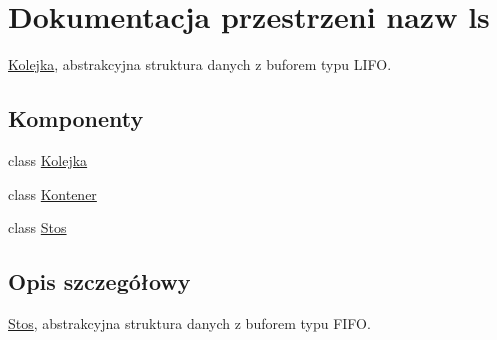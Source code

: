 \hypertarget{namespacels}{\section{Dokumentacja przestrzeni nazw ls}
\label{namespacels}
}


\hyperlink{classls_1_1_kolejka}{Kolejka}, abstrakcyjna struktura danych z buforem typu L\-I\-F\-O.  


\subsection*{Komponenty}
\begin{DoxyCompactItemize}
\item 
class \hyperlink{classls_1_1_kolejka}{Kolejka}
\item 
class \hyperlink{classls_1_1_kontener}{Kontener}
\item 
class \hyperlink{classls_1_1_stos}{Stos}
\end{DoxyCompactItemize}


\subsection{Opis szczegółowy}
\hyperlink{classls_1_1_stos}{Stos}, abstrakcyjna struktura danych z buforem typu F\-I\-F\-O. 